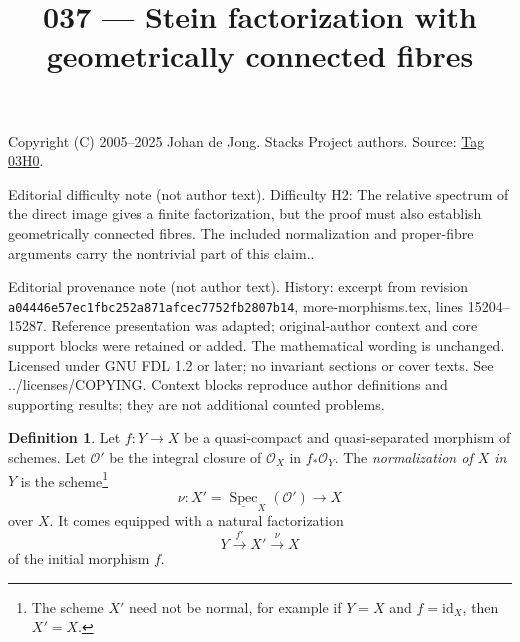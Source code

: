 \documentclass{amsart}
\theoremstyle{plain}
\theoremstyle{definition}
\newtheorem{definition}[subsection]{Definition}
\theoremstyle{remark}
\numberwithin{equation}{subsection}
\def\Spec{\mathop{\mathrm{Spec}}}
\begin{document}
\title[Stacks Project, Tag 03H0]{037 --- Stein factorization with geometrically connected fibres}
\maketitle
\noindent Copyright (C) 2005--2025 Johan de Jong. Stacks Project authors. Source: \href{https://stacks.math.columbia.edu/tag/03H0}{Tag 03H0}.

\noindent Editorial difficulty note (not author text). Difficulty H2: The relative spectrum of the direct image gives a finite factorization, but the proof must also establish geometrically connected fibres. The included normalization and proper-fibre arguments carry the nontrivial part of this claim..

\noindent Editorial provenance note (not author text). History: excerpt from revision \texttt{a0444\allowbreak 6e57e\allowbreak c1fbc\allowbreak 252a8\allowbreak 71afc\allowbreak ec775\allowbreak 2fb28\allowbreak 07b14}, more-morphisms.tex, lines 15204--15287. Reference presentation was adapted; original-author context and core support blocks were retained or added. The mathematical wording is unchanged. Licensed under GNU FDL 1.2 or later; no invariant sections or cover texts. See ../licenses/COPYING. Context blocks reproduce author definitions and supporting results; they are not additional counted problems.

\begin{definition}
\label{morphisms-definition-normalization-X-in-Y}
Let $f : Y \to X$ be a quasi-compact and quasi-separated morphism of schemes.
Let $\mathcal{O}'$ be the integral closure of $\mathcal{O}_X$ in
$f_*\mathcal{O}_Y$. The {\it normalization of $X$ in $Y$} is the
scheme\footnote{The scheme $X'$ need not be normal, for example if
$Y = X$ and $f = \text{id}_X$, then $X' = X$.}
$$
\nu : X' = \underline{\Spec}_X(\mathcal{O}') \to X
$$
over $X$. It comes equipped with a natural factorization
$$
Y \xrightarrow{f'} X' \xrightarrow{\nu} X
$$
of the initial morphism $f$.
\end{definition}
\end{document}
